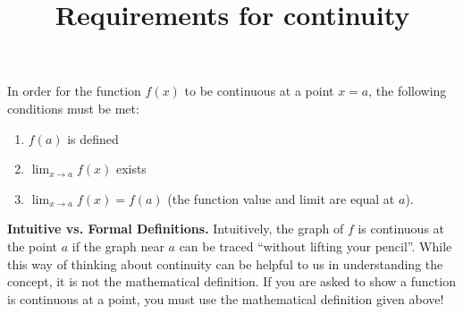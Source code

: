 \documentclass{ximera}
\title{Requirements for continuity}
\begin{document}
\begin{abstract}
\end{abstract}

\maketitle

In order for the function $f(x)$ to be continuous at a point $x=a$, the following conditions must be met:
\begin{enumerate}
    \item $f(a)$ is defined
    \item $\lim_{x \to a} f(x)$ exists
    \item $\lim_{x \to a} f(x) = f(a)$ (the function value and limit are equal at $a$).
\end{enumerate}

\begin{explanation}
    \textbf{Intuitive vs. Formal Definitions.} Intuitively, the graph of $f$ is continuous at the point $a$ if the graph near $a$ can be traced ``without lifting your pencil''. While this way of thinking about continuity can be helpful to us in understanding the concept, it is not the mathematical definition. If you are asked to show a function is continuous at a point, you must use the mathematical definition given above!
\end{explanation}
\end{document}
